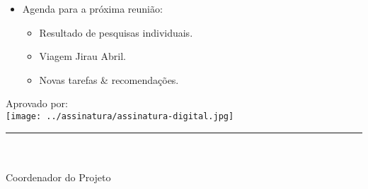 \begin{itemize}

  \item Agenda para a próxima reunião:
  \begin{itemize}
    \item Resultado de pesquisas individuais.
    \item Viagem Jirau Abril.
    \item Novas tarefas \& recomendações.
  \end{itemize}

\end{itemize}

\vspace{5mm}%
\parbox[t]{70mm}{
  Aprovado por: \\[5mm]
  \centering
  \texttt{[image: ../assinatura/assinatura-digital.jpg]} \\[-4mm]
  \rule[2mm]{70mm}{0.1mm} \\
  \ramon \\[1mm]
  Coordenador do Projeto \\
}

\fim